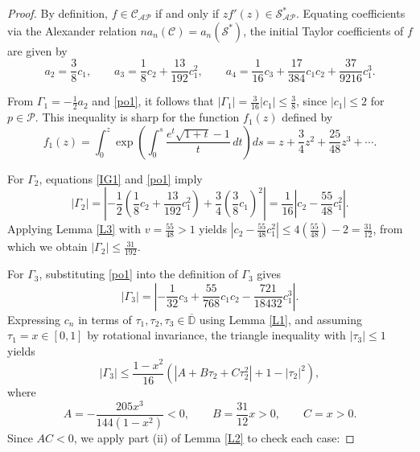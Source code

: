 \documentclass[11pt]{article}
\numberwithin{equation}{section}
\begin{document}
\begin{proof}
By definition, $f \in \mathcal{C}_{\mathcal{AP}}$ if and only if $zf'(z) \in \mathcal{S}_{\mathcal{AP}}^{*}$. Equating coefficients via the Alexander relation $n a_n(\mathcal{C}) = a_n(\mathcal{S}^{*})$, the initial Taylor coefficients of $f$ are given by
\begin{equation}\label{po1}
a_2 = \frac{3}{8}c_1, \qquad a_3 = \frac{1}{8}c_2 + \frac{13}{192}c_1^2, \qquad a_4 = \frac{1}{16}c_3 + \frac{17}{384}c_1c_2 + \frac{37}{9216}c_1^3.
\end{equation}

From $\Gamma_1 = -\frac{1}{2}a_2$ and \eqref{po1}, it follows that $|\Gamma_1| = \frac{3}{16}|c_1| \le \frac{3}{8}$, since $|c_1| \le 2$ for $p \in \mathcal{P}$. This inequality is sharp for the function $f_1(z)$ defined by
\begin{equation}\label{ext1}
f_1(z) = \int_0^z \exp \left( \int_0^s \frac{e^t\sqrt{1+t}-1}{t} \, dt \right) ds = z + \frac{3}{4}z^2 + \frac{25}{48}z^3 + \cdots.
\end{equation}

For $\Gamma_2$, equations \eqref{IG1} and \eqref{po1} imply
\[
|\Gamma_2| = \left| -\frac{1}{2} \left( \frac{1}{8}c_2 + \frac{13}{192}c_1^2 \right) + \frac{3}{4} \left( \frac{3}{8}c_1 \right)^2 \right| = \frac{1}{16}\left| c_2 - \frac{55}{48}c_1^2 \right|.
\]
Applying Lemma \ref{L3} with $v = \frac{55}{48} > 1$ yields $\left| c_2 - \frac{55}{48}c_1^2 \right| \le 4\left(\frac{55}{48}\right)-2 = \frac{31}{12}$, from which we obtain $|\Gamma_2| \le \frac{31}{192}$.

For $\Gamma_3$, substituting \eqref{po1} into the definition of $\Gamma_3$ gives
\begin{equation}\label{po2}
|\Gamma_3| = \left| -\frac{1}{32}c_3 + \frac{55}{768}c_1c_2 - \frac{721}{18432}c_1^3 \right|.
\end{equation}
Expressing $c_n$ in terms of $\tau_1, \tau_2, \tau_3 \in \overline{\mathbb{D}}$ using Lemma \ref{L1}, and assuming $\tau_1 = x \in [0,1]$ by rotational invariance, the triangle inequality with $|\tau_3| \le 1$ yields
\begin{equation}\label{po4}
|\Gamma_3| \le \frac{1 - x^2}{16} \left( \left| A + B \tau_2 + C \tau_2^2 \right| + 1 - |\tau_2|^2 \right),
\end{equation}
where
\begin{equation}\label{po5}
A = -\frac{205x^3}{144(1 - x^2)} < 0, \qquad B = \frac{31}{12}x > 0, \qquad C = x > 0.
\end{equation}
Since $AC < 0$, we apply part (ii) of Lemma \ref{L2} to check each case:


\end{proof}
\end{document}
